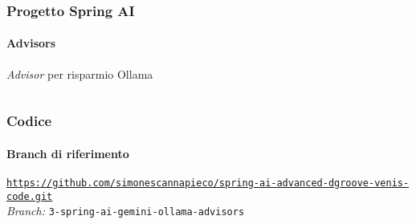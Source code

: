 %
\begin{frame}[t,fragile] \frametitle{Progetto Spring AI}
    \framesubtitle{Advisors}
        \vspace*{-.7cm}
        \begin{block}{\textit{Advisor} per risparmio Ollama}
			{\tiny\inputminted{java}{code/OllamaCostSavingsAdvisor.java}}
    	\end{block}
\end{frame}
%
\begin{frame}[fragile] \frametitle{Codice}
    \framesubtitle{Branch di riferimento}
	\begin{center}
		{\scriptsize \href{https://github.com/simonescannapieco/spring-ai-advanced-dgroove-venis-code.git}{\texttt{https://github.com/simonescannapieco/spring-ai-advanced-dgroove-venis-code.git}}}\\
		\textit{Branch:} \alert{\texttt{3-spring-ai-gemini-ollama-advisors}}
	\end{center}
\end{frame}